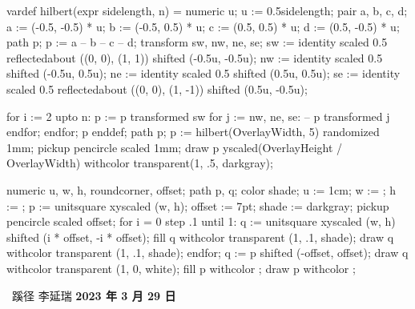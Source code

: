 \startMPinclusions
vardef hilbert(expr sidelength, n) = 
  numeric u; u := 0.5sidelength;
  pair a, b, c, d;
  a := (-0.5, -0.5) * u;
  b := (-0.5, 0.5) * u;
  c := (0.5, 0.5) * u;
  d := (0.5, -0.5) * u;
  path p; 
  p := a -- b -- c -- d;
  transform sw, nw, ne, se;
  sw := identity
        scaled 0.5
        reflectedabout ((0, 0), (1, 1))
        shifted (-0.5u, -0.5u);
  nw := identity
        scaled 0.5
        shifted (-0.5u, 0.5u);
  ne := identity
        scaled 0.5
        shifted (0.5u, 0.5u);
  se := identity
        scaled 0.5
        reflectedabout ((0, 0), (1, -1))
        shifted (0.5u, -0.5u);

  for i := 2 upto n:
    p := p transformed sw for j := nw, ne, se: -- p transformed j endfor;
  endfor;
  p
enddef;
\stopMPinclusions
{}
path p; p := hilbert(OverlayWidth, 5) randomized 1mm;
pickup pencircle scaled 1mm;
draw p yscaled(OverlayHeight / OverlayWidth) withcolor transparent(1, .5, darkgray); %
\stopuseMPgraphic
{}

numeric u, w, h, roundcorner, offset;
path p, q;
color shade;
u := 1cm; w := \overlaywidth; h := \overlayheight;
p := unitsquare xyscaled (w, h);
offset := 7pt;
shade := darkgray;
pickup pencircle scaled offset;
for i = 0 step .1 until 1:
    q := unitsquare xyscaled (w, h) shifted (i * offset, -i * offset);
    fill q withcolor transparent (1, .1, shade);
    draw q withcolor transparent (1, .1, shade);
endfor;
q := p shifted (-offset, offset);
draw q withcolor transparent (1, 0, white);
fill p withcolor ;
draw p withcolor ;
\stopuniqueMPgraphic
{}

\setupbackgrounds[page][background=TitleGraphic]
\startstandardmakeup
  \startcolor[white]
    \startcoverbox[middle][width=.6\textwidth,height=5cm,toffset=.8cm]
      \strut
      \hfil \bfd\ConTeXt\ 蹊径\hfil
      \blank[1cm]
      \hfil\bfa 李延瑞\hfil
      \blank[.25cm]
      \hfil\bf 2023 年 3 月 29 日\hfil
    \stopcoverbox
  \stopcolor
  \blank[14cm]
\stopstandardmakeup
\setupbackgrounds[page][background=]
